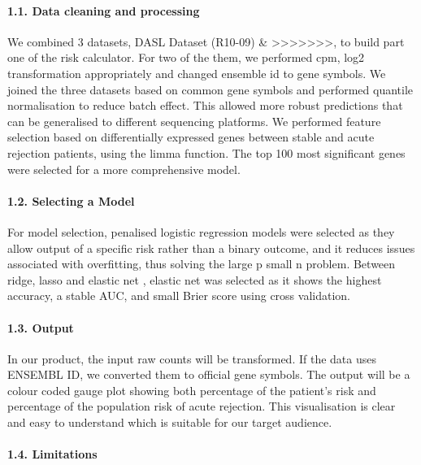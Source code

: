 \documentclass[a4paper,9pt,twocolumn,twoside,]{pinp}
\begin{document}
\hypertarget{data-cleaning-and-processing}{%
\paragraph{1.1. Data cleaning and
processing}\label{data-cleaning-and-processing}}

We combined 3 datasets, DASL Dataset (R10-09) \&
\textgreater{}\textgreater{}\textgreater{}\textgreater{}\textgreater{}\textgreater{}\textgreater{},
to build part one of the risk calculator. For two of the them, we
performed cpm, log2 transformation appropriately and changed ensemble id
to gene symbols. We joined the three datasets based on common gene
symbols and performed quantile normalisation to reduce batch effect.
This allowed more robust predictions that can be generalised to
different sequencing platforms. We performed feature selection based on
differentially expressed genes between stable and acute rejection
patients, using the limma function. The top 100 most significant genes
were selected for a more comprehensive model.

\hypertarget{selecting-a-model}{%
\paragraph{1.2. Selecting a Model}\label{selecting-a-model}}

For model selection, penalised logistic regression models were selected
as they allow output of a specific risk rather than a binary outcome,
and it reduces issues associated with overfitting, thus solving the
large p small n problem. Between ridge, lasso and elastic net , elastic
net was selected as it shows the highest accuracy, a stable AUC, and
small Brier score using cross validation.

\hypertarget{output}{%
\paragraph{1.3. Output}\label{output}}

In our product, the input raw counts will be transformed. If the data
uses ENSEMBL ID, we converted them to official gene symbols. The output
will be a colour coded gauge plot showing both percentage of the
patient's risk and percentage of the population risk of acute rejection.
This visualisation is clear and easy to understand which is suitable for
our target audience.

\hypertarget{limitations}{%
\paragraph{1.4. Limitations}\label{limitations}}
\end{document}
